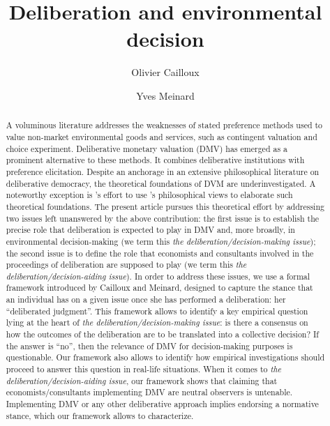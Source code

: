 \documentclass[version=3.21, pagesize, twoside=off, bibliography=totoc, DIV=calc, fontsize=12pt, a4paper, french, english]{scrartcl}
\newcommand{\institute}[1]{}
\newcommand{\keywords}[1]{}
\begin{document}
\title{Deliberation and environmental decision}
\author{Olivier Cailloux \and Yves Meinard}
\institute{
	Olivier Cailloux 
	\and
	Yves Meinard 
	\at 
	Université Paris-Dauphine, \\
	PSL Research University, \\
	CNRS, \\
	LAMSADE\\
	75016 PARIS, FRANCE\\
	\email{olivier.cailloux@dauphine.fr}
}
\makeatletter
\makeatother
\maketitle

\keywords{decision aid, justification, empirical validation, methodology}

\begin{abstract}
A voluminous literature addresses the weaknesses of stated preference methods used to value non-market environmental goods and services, such as contingent valuation and choice experiment. Deliberative monetary valuation (DMV) has emerged as a prominent alternative to these methods. It combines deliberative institutions with preference elicitation. Despite an anchorage in an extensive philosophical literature on deliberative democracy, the theoretical foundations of DVM are underinvestigated.  A noteworthy exception is \citeauthor{bartkowski_beyond_2018}'s effort to use \citeauthor{sen_idea_2009}'s philosophical views to elaborate such theoretical foundations. The present article pursues this theoretical effort by addressing two issues left unanswered by the above contribution: the first issue is to establish the precise role that deliberation is expected to play in DMV and, more broadly, in environmental decision-making (we term this \emph{the deliberation/decision-making issue}); the second issue is to define the role that economists and consultants involved in the proceedings of deliberation are supposed to play (we term this \emph{the deliberation/decision-aiding issue}). In order to address these issues, we use a formal framework introduced by Cailloux and Meinard, designed to capture the stance that an individual has on a given issue once she has performed a deliberation: her ``deliberated judgment''. This framework allows to identify a key empirical question lying at the heart of \emph{the deliberation/decision-making issue}: is there a consensus on how the outcomes of the deliberation are to be translated into a collective decision? If the answer is ``no'', then the relevance of DMV for decision-making purposes is questionable. Our framework also allows to identify how empirical investigations should proceed to answer this question in real-life situations. 
When it comes to \emph{the deliberation/decision-aiding issue}, our framework shows that claiming that economists/consultants implementing DMV are neutral observers is untenable. Implementing DMV or any other deliberative approach implies endorsing a normative stance, which our framework allows to characterize.
\end{abstract}
\end{document}
